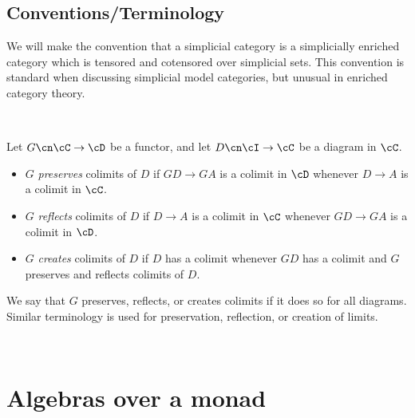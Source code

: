 \documentclass[leqno,oneside,english]{elsarticle}
\newcounter{enumisaved}
\newlength{\thmsaved}
\newlength{\thmnow}
\begin{document}
\subsection*{Conventions/Terminology}

We will make the convention that a simplicial category is a simplicially
enriched category which is tensored and cotensored over simplicial sets.
This convention is standard when discussing simplicial model categories,
but unusual in enriched category theory. 

{{    {}  \ifshowcomplete
  \ 
  {
\begin{defn*}
  \begin{samepage}
   Let $G \cn \cC \to \cD$ be a functor, and let $D \cn \cI \to \cC$
   be a diagram in $\cC$.
   \begin{itemize}
   \item $G$ \emph{preserves} colimits of $D$ if $GD \to GA$ is a
     colimit in $\cD$ whenever $D \to A$ is a colimit in $\cC$.  
   \item $G$ \emph{reflects} colimits of $D$ if $D \to A$ is a
     colimit in $\cC$ whenever $GD \to GA$ is a colimit in $\cD$.
   \item $G$ \emph{creates} colimits of $D$ if $D$ has a colimit
     whenever $GD$ has a colimit and $G$ preserves and
     reflects colimits of $D$.
   \end{itemize}
  \end{samepage}
 We say that $G$ preserves, reflects, or creates colimits if it does
 so for all diagrams.  Similar terminology is used for preservation,
 reflection, or creation of limits.
\end{defn*}

}
  {}
  \ 
  \ifthenelse{\lengthtest{\thmnow > \thmsaved}}{
    
    \setcounter{thm}{{\strip@pt{\thmsaved}}}  
  }{
    
  }
  \setcounter{enumi}{\theenumisaved}
    \else  \fi
}}{}

\addtocounter{tocdepth}{1}
\section{Algebras over a monad}\label{sec:t-algebras}
\end{document}
